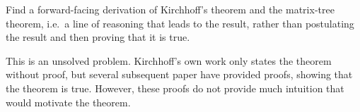 Find a forward-facing derivation of Kirchhoff's theorem and the matrix-tree theorem, i.e.~a line of reasoning that leads to the result, rather than postulating the result and then proving that it is true.

\solution
This is an unsolved problem. Kirchhoff's own work only states the theorem without proof, but several subsequent paper have provided proofs, showing that the theorem is true. However, these proofs do not provide much intuition that would motivate the theorem. 